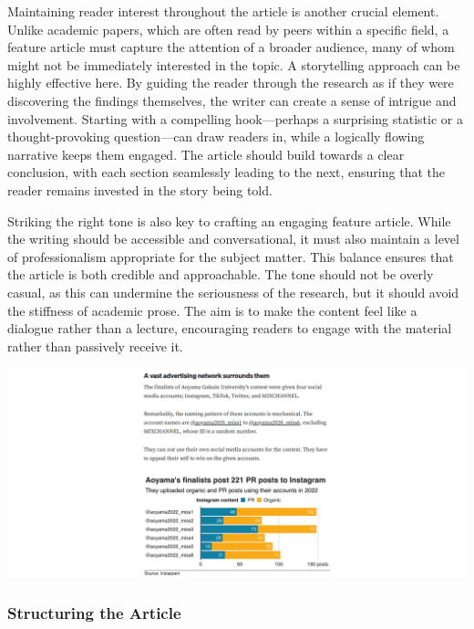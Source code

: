 \documentclass[
]{book}
\begin{document}
Maintaining reader interest throughout the article is another crucial element. Unlike academic papers, which are often read by peers within a specific field, a feature article must capture the attention of a broader audience, many of whom might not be immediately interested in the topic. A storytelling approach can be highly effective here. By guiding the reader through the research as if they were discovering the findings themselves, the writer can create a sense of intrigue and involvement. Starting with a compelling hook---perhaps a surprising statistic or a thought-provoking question---can draw readers in, while a logically flowing narrative keeps them engaged. The article should build towards a clear conclusion, with each section seamlessly leading to the next, ensuring that the reader remains invested in the story being told.

Striking the right tone is also key to crafting an engaging feature article. While the writing should be accessible and conversational, it must also maintain a level of professionalism appropriate for the subject matter. This balance ensures that the article is both credible and approachable. The tone should not be overly casual, as this can undermine the seriousness of the research, but it should avoid the stiffness of academic prose. The aim is to make the content feel like a dialogue rather than a lecture, encouraging readers to engage with the material rather than passively receive it.

\href{https://medium.com/@nishiyama.ry/data-analysis-problematic-and-exploitative-beauty-contests-in-japanese-universities-fe551d31fa66}{\includegraphics[width=1\textwidth,height=\textheight]{images/feature-article.png}}

\subsubsection*{Structuring the Article}\label{structuring-the-article}
\end{document}
